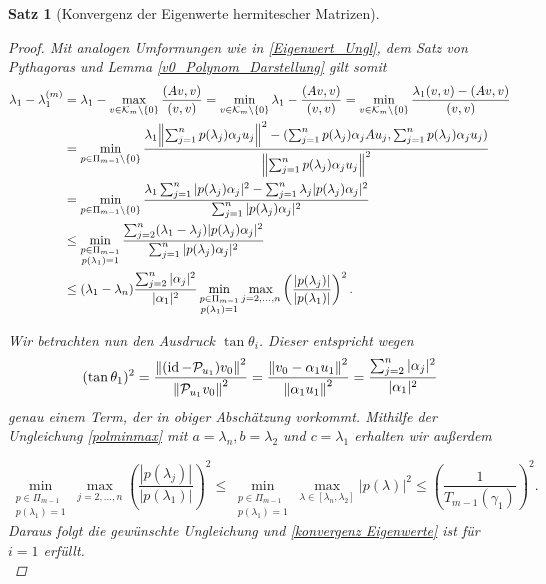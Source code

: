 \documentclass{article}
\theoremstyle{plain}
\newtheorem{theorem}    {Satz}   [section]
\begin{document}
\begin{theorem}[Konvergenz der Eigenwerte hermitescher Matrizen]
\begin{proof}
	Mit analogen Umformungen wie in \eqref{Eigenwert_Ungl}, dem Satz von Pythagoras und Lemma \ref{v0_Polynom_Darstellung} gilt somit
	\begin{equation}
		\label{Ungl i=1}
		\begin{aligned}
			\lambda_1 - \lambda_1^{(m)} &= \lambda_1 - \max_{v \in \mathcal{K}_m \setminus\{0\}} \frac{(Av,v)}{(v,v)} = \min_{v \in \mathcal{K}_m\setminus\{0\}} \lambda_1 - \frac{(Av,v)}{(v,v)} = \min_{v \in \mathcal{K}_m\setminus\{0\}} \frac{\lambda_1(v,v) - (Av,v)}{(v,v)} \\ &= \min_{p\in \Pi_{m-1}\setminus \{0\}} \frac{\lambda_1 {\left \| \sum_{j=1}^{n}p(\lambda_j)\alpha_j u_j \right \|}_{}^2 - (\sum_{j=1}^{n}p(\lambda_j)\alpha_j A u_j,\sum_{j=1}^{n}p(\lambda_j)\alpha_j u_j)}{{\left \| \sum_{j=1}^{n}p(\lambda_j)\alpha_j u_j \right \|}_{}^2} \\
			&= \min_{p\in \Pi_{m-1}\setminus \{0\}} \frac{\lambda_1 \sum_{j=1}^{n} |p(\lambda_j)\alpha_j|^2 - \sum_{j=1}^{n} \lambda_j |p(\lambda_j)\alpha_j|^2 }{\sum_{j=1}^{n} |p(\lambda_j)\alpha_j|^2} \\
			&\le \min_{\substack{p\in \Pi_{m-1} \\ p(\lambda_1) =1}} \frac{\sum_{j=2}^{n} (\lambda_1 - \lambda_j)|p(\lambda_j)\alpha_j|^2}{\sum_{j=1}^{n} |p(\lambda_j)\alpha_j|^2} \\
			&\le (\lambda_1 - \lambda_n) \frac{\sum_{j=2}^{n} |\alpha_j|^2}{|\alpha_1|^2} \min_{\substack{p\in \Pi_{m-1} \\ p(\lambda_1) =1}} \max_{j=2,\dots,n} \left(\frac{|p(\lambda_j)|}{|p(\lambda_1)|}\right)^2.
		\end{aligned}
	\end{equation}

	Wir betrachten nun den Ausdruck $\tan \theta_i$. Dieser entspricht wegen
		\begin{equation*}
			(\tan\theta_1)^2 = \frac{{\left \| (\operatorname{id} - \mathcal{P}_{u_1})v_0 \right \|}_{}^2}{{\left \|  \mathcal{P}_{u_1}v_0 \right \|}_{}^2} = \frac{{\left \| v_0 - \alpha_1 u_1 \right \|}_{}^2}{{\left \| \alpha_1 u_1 \right \|}_{}^2} = \frac{\sum_{j=2}^{n} |\alpha_j|^2}{|\alpha_1|^2}
		\end{equation*}
	genau einem Term, der in obiger Abschätzung vorkommt.
	Mithilfe der Ungleichung \eqref{polminmax} mit $a = \lambda_n, b= \lambda_2$ und $c= \lambda_1$ erhalten wir außerdem

		\begin{equation*}
			\min_{\substack{p\in \Pi_{m-1} \\ p(\lambda_1) = 1}} \max_{j=2,\dots,n} 	\left(\frac{|p(\lambda_j)|}{|p(\lambda_1)|}\right)^2 \le \min_{\substack{p\in \Pi_{m-1} \\ p(\lambda_1) = 1}} \max_{\lambda \in [\lambda_n,\lambda_2]} |p(\lambda)|^2 \le \left(\frac{1}{T_{m-1}(\gamma_1)}\right)^2.
		\end{equation*}
	Daraus folgt die gewünschte Ungleichung und \eqref{konvergenz Eigenwerte} ist für $i = 1$ erfüllt.\\


\end{proof}
\end{theorem}
\end{document}
